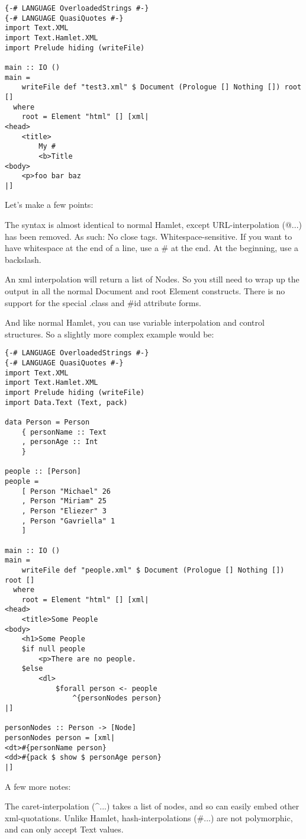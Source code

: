 \begin{lstlisting}
{-# LANGUAGE OverloadedStrings #-}
{-# LANGUAGE QuasiQuotes #-}
import Text.XML
import Text.Hamlet.XML
import Prelude hiding (writeFile)

main :: IO ()
main =
    writeFile def "test3.xml" $ Document (Prologue [] Nothing []) root []
  where
    root = Element "html" [] [xml|
<head>
    <title>
        My #
        <b>Title
<body>
    <p>foo bar baz
|]
\end{lstlisting}%

Let's make a few points:

  
The syntax is almost identical to normal Hamlet, except URL-interpolation (@{...}) has been
removed. As such:
  No close tags.
  Whitespace-sensitive.
  If you want to have whitespace at the end of a line, use a # at the end. At the beginning,
  use a backslash.
  
An xml interpolation will return a list of Nodes. So you still need to wrap up the output in all the normal
Document and root Element constructs.
There is no support for the special .class and
  #id attribute forms.
  
And like normal Hamlet, you can use variable interpolation and control structures. So a
slightly more complex example would be:

\begin{lstlisting}
{-# LANGUAGE OverloadedStrings #-}
{-# LANGUAGE QuasiQuotes #-}
import Text.XML
import Text.Hamlet.XML
import Prelude hiding (writeFile)
import Data.Text (Text, pack)

data Person = Person
    { personName :: Text
    , personAge :: Int
    }

people :: [Person]
people =
    [ Person "Michael" 26
    , Person "Miriam" 25
    , Person "Eliezer" 3
    , Person "Gavriella" 1
    ]

main :: IO ()
main =
    writeFile def "people.xml" $ Document (Prologue [] Nothing []) root []
  where
    root = Element "html" [] [xml|
<head>
    <title>Some People
<body>
    <h1>Some People
    $if null people
        <p>There are no people.
    $else
        <dl>
            $forall person <- people
                ^{personNodes person}
|]

personNodes :: Person -> [Node]
personNodes person = [xml|
<dt>#{personName person}
<dd>#{pack $ show $ personAge person}
|]
\end{lstlisting}%

A few more notes:

  
   The caret-interpolation (^{...}) takes a list of nodes, and so can easily embed
                other xml-quotations.
   Unlike Hamlet, hash-interpolations (#{...}) are not polymorphic, and can only accept Text values.
  
